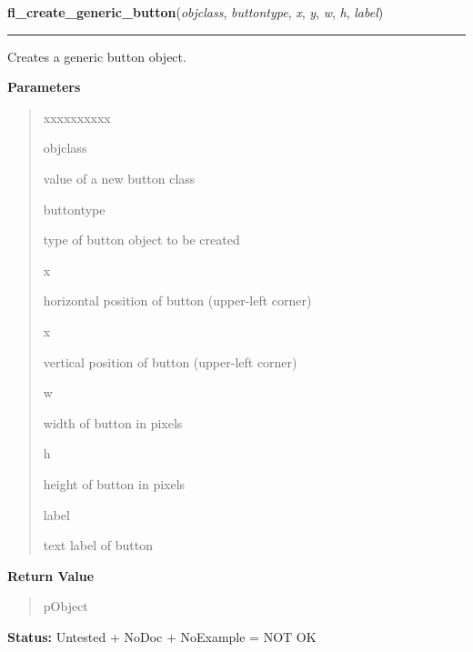 \hspace{.8\funcindent}\begin{boxedminipage}{\funcwidth}

    \raggedright \textbf{fl\_create\_generic\_button}(\textit{objclass}, \textit{buttontype}, \textit{x}, \textit{y}, \textit{w}, \textit{h}, \textit{label})

    \vspace{-1.5ex}

    \rule{\textwidth}{0.5\fboxrule}
\setlength{\parskip}{2ex}
    Creates a generic button object.

\setlength{\parskip}{1ex}
      \textbf{Parameters}
      \vspace{-1ex}

      \begin{quote}
        \begin{Ventry}{xxxxxxxxxx}

          \item[objclass]

          value of a new button class

          \item[buttontype]

          type of button object to be created

          \item[x]

          horizontal position of button (upper-left corner)

          \item[x]

          vertical position of button (upper-left corner)

          \item[w]

          width of button in pixels

          \item[h]

          height of button in pixels

          \item[label]

          text label of button

        \end{Ventry}

      \end{quote}

      \textbf{Return Value}
    \vspace{-1ex}

      \begin{quote}
      pObject

      \end{quote}

\textbf{Status:} Untested + NoDoc + NoExample = NOT OK



    \end{boxedminipage}

